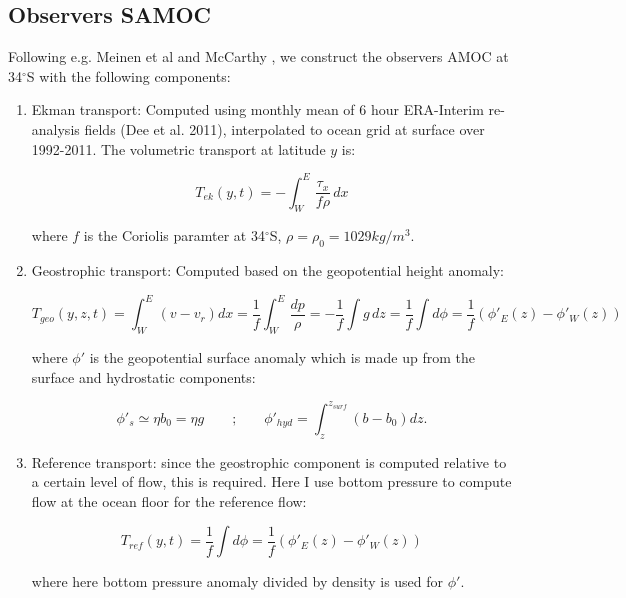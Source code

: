 \documentclass[a4paper,11pt]{article}
\newcommand{\degSym}{$^{\circ}$}
\begin{document}
   \subsection{Observers SAMOC}
    \label{obsSAMOC}
    
    Following e.g. Meinen et al \cite{meinenSamoc} and McCarthy \cite{mcCarthy}, we construct the observers AMOC at 34\degSym S with the following components: 
    
    \begin{enumerate}
     \item Ekman transport: Computed using monthly mean of 6 hour ERA-Interim re-analysis fields (Dee et al. 2011), interpolated to ocean grid at surface over 1992-2011. The volumetric transport at latitude $y$ is: %
     
     \begin{equation}
      T_{ek}(y,t) = -\int_W^E\frac{\tau_x}{f\rho} \, dx
      \label{eq:ekTransp}
     \end{equation}
     
     where $f$ is the Coriolis paramter at 34\degSym S, $\rho = \rho_0 = 1029 kg/m^3$. 
     
     \item Geostrophic transport: Computed based on the geopotential height anomaly:
     
     \begin{equation}
      T_{geo}(y,z,t) = \int_W^E(v-v_r)dx = \dfrac{1}{f}\int_W^E \dfrac{dp}{\rho} = - \dfrac{1}{f} \int g\,dz = \dfrac{1}{f} \int d\phi= \dfrac{1}{f} (\phi'_E(z) - \phi'_W(z))
      \label{eq:geoTransp}
     \end{equation}
     
     where $\phi'$ is the geopotential surface anomaly which is made up from the surface and hydrostatic components:
     
     \begin{equation}
      \phi'_s \simeq \eta b_0 = \eta g \qquad\text{;}\qquad \phi'_{hyd} = \int_z^{z_{surf}} (b-b_0)dz .
      \label{eq:phiEqns}
     \end{equation}
    
    \item Reference transport: since the geostrophic component is computed relative to a certain level of flow, this is required. Here I use bottom pressure to compute flow at the ocean floor for the reference flow: 
    
    \begin{equation}
     T_{ref}(y,t) = \dfrac{1}{f} \int d\phi= \dfrac{1}{f} (\phi'_E(z) - \phi'_W(z))
     \label{eq:refTransp}
    \end{equation}

    where here bottom pressure anomaly divided by density is used for $\phi'$. 
 
    \end{enumerate}
    
\end{document}

